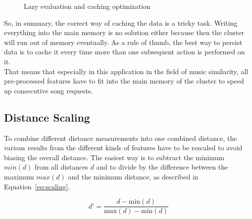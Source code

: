 \begin{figure}[htbp]
	\centering
	\caption{Lazy evaluation and caching optimization}
	\label{lazcach}
\end{figure}
\FloatBarrier

\noindent So, in summary, the correct way of caching the data is a tricky task. Writing everything into the main memory is no solution either because then the cluster will run out of memory eventually. As a rule of thumb, the best way to persist data is to cache it every time more than one subsequent action is performed on it.\\
That means that especially in this application in the field of music similarity, all pre-processed features have to fit into the main memory of the cluster to speed up consecutive song requests. 

\subsection{Distance Scaling}\label{distsc}

To combine different distance measurements into one combined distance, the various results from the different kinds of features have to be rescaled to avoid biasing the overall distance.
The easiest way is to subtract the minimum $min(d)$ from all distances $d$ and to divide by the difference between the maximum $max(d)$ and the minimum distance, as described in Equation~\eqref{eq:scaling}. 

\begin{equation} \label{eq:scaling}
d' = \frac{d - \text{min}(d)}{\text{max}(d) - \text{min}(d)}
\end{equation}

